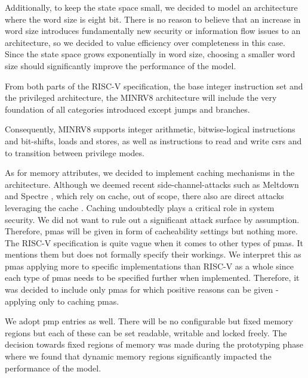Additionally, to keep the state space small, we decided to model an architecture where the word size is eight bit.
There is no reason to believe that an increase in word size introduces fundamentally new security or information flow issues to an architecture, so we decided to value efficiency over completeness in this case.
Since the state space grows exponentially in word size, choosing a smaller word size should significantly improve the performance of the model.

From both parts of the RISC-V specification, the base integer instruction set and the privileged architecture, the MINRV8 architecture will include the very foundation of all categories introduced except jumps and branches.

Consequently, MINRV8 supports integer arithmetic, bitwise-logical instructions and bit-shifts, loads and stores, as well as instructions to read and write \glspl{csr} and to transition between privilege modes.

As for memory attributes, we decided to implement caching mechanisms in the architecture.
Although we deemed recent side-channel-attacks such as Meltdown \cite{Lipp2018meltdown} and Spectre \cite{Kocher2018spectre}, which rely on cache, out of scope, there also are direct attacks leveraging the cache \cite{Wojtczuk09}.
Caching undoubtedly plays a critical role in system security.
We did not want to rule out a significant attack surface by assumption.
Therefore, \glspl{pma} will be given in form of cacheability settings but nothing more.
The RISC-V specification is quite vague when it comes to other types of \glspl{pma}.
It mentions them but does not formally specify their workings.
We interpret this as \glspl{pma} applying more to specific implementations than RISC-V as a whole since each type of \glspl{pma} needs to be specified further when implemented.
Therefore, it was decided to include only \glspl{pma} for which positive reasons can be given - applying only to caching \glspl{pma}.

We adopt \gls{pmp} entries as well.
There will be no configurable but fixed memory regions but each of these can be set readable, writable and locked freely.
The decision towards fixed regions of memory was made during the prototyping phase where we found that dynamic memory regions significantly impacted the performance of the model.

